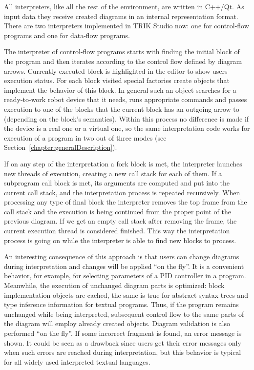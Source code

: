 \documentclass[conference]{IEEEtran}
\begin{document}
All interpreters, like all the rest of the environment, are written in C++/Qt. As input data they receive created diagrams in an internal representation format. There are two interpreters implemented in TRIK Studio now: one for control-flow programs and one for data-flow programs.

The interpreter of control-flow programs starts with finding the initial block of the program and then iterates according to the control flow defined by diagram arrows. Currently executed block is highlighted in the editor to show users execution status. For each block visited special factories create objects that implement the behavior of this block. In general such an object searches for a ready-to-work robot device that it needs, runs appropriate commands and passes execution to one of the blocks that the current block has an outgoing arrow to (depending on the block's semantics). Within this process no difference is made if the device is a real one or a virtual one, so the same interpretation code works for execution of a program in two out of three modes (see Section~\ref{chapter:generalDescription}).

If on any step of the interpretation a fork block is met, the interpreter launches new threads of execution, creating a new call stack for each of them. If a subprogram call block is met, its arguments are computed and put into the current call stack, and the interpretation process is repeated recursively. When processing any type of final block the interpreter removes the top frame from the call stack and the execution is being continued from the proper point of the previous diagram. If we get an empty call stack after removing the frame, the current execution thread is considered finished. This way the interpretation process is going on while the interpreter is able to find new blocks to process.

An interesting consequence of this approach is that users can change diagrams during interpretation and changes will be applied ``on the fly''. It is a convenient behavior, for example, for selecting parameters of a PID controller in a program. Meanwhile, the execution of unchanged diagram parts is optimized: block implementation objects are cached, the same is true for abstract syntax trees and type inference information for textual programs. Thus, if the program remains unchanged while being interpreted, subsequent control flow to the same parts of the diagram will employ already created objects. Diagram validation is also performed ``on the fly''. If some incorrect fragment is found, an error message is shown. It could be seen as a drawback since users get their error messages only when such errors are reached during interpretation, but this behavior is typical for all widely used interpreted textual languages.
\end{document}
